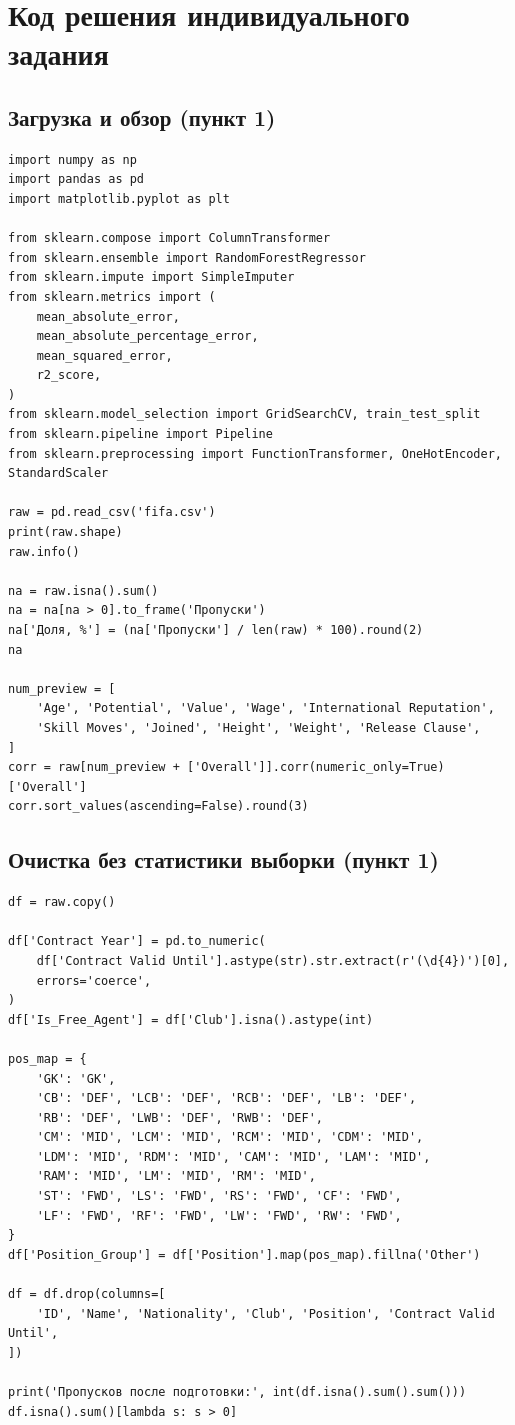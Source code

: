 \documentclass[14pt]{extarticle}
\begin{document}
\section{Код решения индивидуального задания}

\subsection{Загрузка и обзор (пункт 1)}
\begin{verbatim}
import numpy as np
import pandas as pd
import matplotlib.pyplot as plt

from sklearn.compose import ColumnTransformer
from sklearn.ensemble import RandomForestRegressor
from sklearn.impute import SimpleImputer
from sklearn.metrics import (
    mean_absolute_error,
    mean_absolute_percentage_error,
    mean_squared_error,
    r2_score,
)
from sklearn.model_selection import GridSearchCV, train_test_split
from sklearn.pipeline import Pipeline
from sklearn.preprocessing import FunctionTransformer, OneHotEncoder, StandardScaler

raw = pd.read_csv('fifa.csv')
print(raw.shape)
raw.info()

na = raw.isna().sum()
na = na[na > 0].to_frame('Пропуски')
na['Доля, %'] = (na['Пропуски'] / len(raw) * 100).round(2)
na

num_preview = [
    'Age', 'Potential', 'Value', 'Wage', 'International Reputation',
    'Skill Moves', 'Joined', 'Height', 'Weight', 'Release Clause',
]
corr = raw[num_preview + ['Overall']].corr(numeric_only=True)['Overall']
corr.sort_values(ascending=False).round(3)
\end{verbatim}

\subsection{Очистка без статистики выборки (пункт 1)}
\begin{verbatim}
df = raw.copy()

df['Contract Year'] = pd.to_numeric(
    df['Contract Valid Until'].astype(str).str.extract(r'(\d{4})')[0],
    errors='coerce',
)
df['Is_Free_Agent'] = df['Club'].isna().astype(int)

pos_map = {
    'GK': 'GK',
    'CB': 'DEF', 'LCB': 'DEF', 'RCB': 'DEF', 'LB': 'DEF',
    'RB': 'DEF', 'LWB': 'DEF', 'RWB': 'DEF',
    'CM': 'MID', 'LCM': 'MID', 'RCM': 'MID', 'CDM': 'MID',
    'LDM': 'MID', 'RDM': 'MID', 'CAM': 'MID', 'LAM': 'MID',
    'RAM': 'MID', 'LM': 'MID', 'RM': 'MID',
    'ST': 'FWD', 'LS': 'FWD', 'RS': 'FWD', 'CF': 'FWD',
    'LF': 'FWD', 'RF': 'FWD', 'LW': 'FWD', 'RW': 'FWD',
}
df['Position_Group'] = df['Position'].map(pos_map).fillna('Other')

df = df.drop(columns=[
    'ID', 'Name', 'Nationality', 'Club', 'Position', 'Contract Valid Until',
])

print('Пропусков после подготовки:', int(df.isna().sum().sum()))
df.isna().sum()[lambda s: s > 0]
\end{verbatim}
\end{document}
